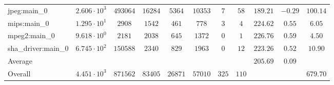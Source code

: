 \begin{tabular}{|l|c|c|c|c|c|c|c|c|c|c|}
jpeg:main\_0            & $ 2.606 \cdot 10^{3}  $ & $ 493064 $ & $ 16284 $ & $ 5364  $ & $ 10353 $ & $ 7   $ & $ 58  $ & $ 189.21      $ & $ -0.29   $ & $ 100.14  $ \\
mips:main\_0            & $ 1.295 \cdot 10^{1}  $ & $ 2908   $ & $ 1542  $ & $ 461   $ & $ 778   $ & $ 3   $ & $ 4   $ & $ 224.62      $ & $ 0.55    $ & $ 6.05    $ \\
mpeg2:main\_0           & $ 9.618 \cdot 10^{0}  $ & $ 2181   $ & $ 2038  $ & $ 645   $ & $ 1372  $ & $ 0   $ & $ 1   $ & $ 226.76      $ & $ 0.59    $ & $ 4.50    $ \\
sha\_driver:main\_0     & $ 6.745 \cdot 10^{2}  $ & $ 150588 $ & $ 2340  $ & $ 829   $ & $ 1963  $ & $ 0   $ & $ 12  $ & $ 223.26      $ & $ 0.52    $ & $ 10.90   $ \\
\hline
Average                 & $                     $ & $        $ & $       $ & $       $ & $       $ & $     $ & $     $ & $ 205.69      $ & $ 0.09    $ & $         $ \\
\hline
Overall                 & $ 4.451 \cdot 10^{3}  $ & $ 871562 $ & $ 83405 $ & $ 26871 $ & $ 57010 $ & $ 325 $ & $ 110 $ & $             $ & $         $ & $ 679.70  $ \\
\hline
\end{tabular}
